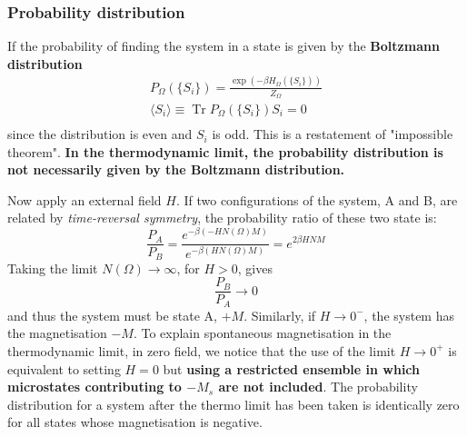 \documentclass[12pt,titlepage]{article}
\numberwithin{equation}{section}
\begin{document}
\subsubsection{Probability distribution}
If the probability of finding the system in a state is given by the \textbf{Boltzmann distribution}
\begin{equation}
    \begin{split}
        P _ { \Omega } ( \{ S _ { i } \} ) = \frac { \exp ( - \beta H _ { \Omega } ( \{ S _ { i } \} ) ) } { Z _ { \Omega } }\\
        \langle S _ { i } \rangle \equiv \operatorname { Tr } P _ { \Omega } ( \{ S _ { i } \} ) S _ { i } = 0\\
    \end{split}
\end{equation}
since the distribution is even and $S_i$ is odd. This is a restatement of "impossible theorem".  \textbf{In the thermodynamic limit, the probability distribution is not necessarily given by the Boltzmann distribution.}

Now apply an external field $H$. If two configurations of the system, A and B, are related by \emph{time-reversal symmetry}, the probability ratio of these two state is:
\begin{equation}
     \frac { P _ { A } } { P _ { B } } = \frac { e ^ { - \beta ( - H N ( \Omega ) M ) } } { e ^ { - \beta ( H N ( \Omega ) M ) } } = e^{2\beta HNM}
\end{equation}
Taking the limit $N ( \Omega )\rightarrow\infty$, for $H>0$, gives
\begin{equation}
    \frac{P_B}{P_A}\rightarrow0
\end{equation}
and thus the system must be state A, $+M$. Similarly, if $H\rightarrow0^-$, the system has the magnetisation $-M$. To explain spontaneous magnetisation in the thermodynamic limit, in zero field, we notice that the use of the limit $H\rightarrow 0^+$ is equivalent to setting $H=0$ but \textbf{using a restricted ensemble in which microstates contributing to $-M_s$ are not included}. The probability distribution for a system after the thermo limit has been taken is identically zero for all states whose magnetisation is negative.
\end{document}
